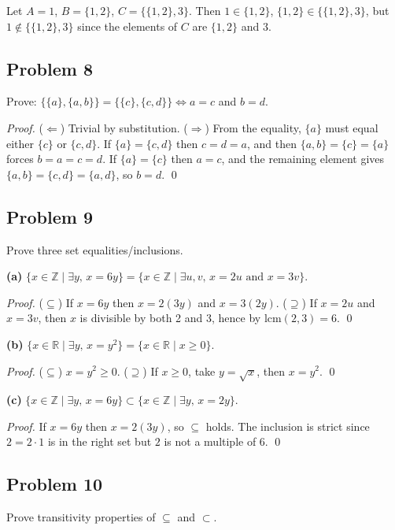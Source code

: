 Let $A = 1$, $B = \{1,2\}$, $C = \{\{1,2\},3\}$.
Then $1 \in \{1,2\}$, $\{1,2\} \in \{\{1,2\},3\}$, but $1 \notin \{\{1,2\},3\}$ since the elements of $C$ are $\{1,2\}$ and $3$.

\subsection*{Problem 8}
Prove: $\{\{a\},\{a,b\}\} = \{\{c\},\{c,d\}\} \iff a=c$ and $b=d$.

\textit{Proof.}
($\Leftarrow$) Trivial by substitution.
($\Rightarrow$) From the equality, $\{a\}$ must equal either $\{c\}$ or $\{c,d\}$.
If $\{a\} = \{c,d\}$ then $c = d = a$, and then $\{a,b\} = \{c\} = \{a\}$ forces $b = a = c = d$.
If $\{a\} = \{c\}$ then $a = c$, and the remaining element gives $\{a,b\} = \{c,d\} = \{a,d\}$, so $b = d$. \qed

\subsection*{Problem 9}
Prove three set equalities/inclusions.

\textbf{(a)} $\{x \in \mathbb{Z} \mid \exists y,\, x = 6y\} = \{x \in \mathbb{Z} \mid \exists u,v,\, x = 2u \text{ and } x = 3v\}$.

\textit{Proof.} ($\subseteq$) If $x = 6y$ then $x = 2(3y)$ and $x = 3(2y)$.
($\supseteq$) If $x = 2u$ and $x = 3v$, then $x$ is divisible by both 2 and 3, hence by $\mathrm{lcm}(2,3) = 6$. \qed

\textbf{(b)} $\{x \in \mathbb{R} \mid \exists y,\, x = y^2\} = \{x \in \mathbb{R} \mid x \ge 0\}$.

\textit{Proof.} ($\subseteq$) $x = y^2 \ge 0$.
($\supseteq$) If $x \ge 0$, take $y = \sqrt{x}$, then $x = y^2$. \qed

\textbf{(c)} $\{x \in \mathbb{Z} \mid \exists y,\, x = 6y\} \subset \{x \in \mathbb{Z} \mid \exists y,\, x = 2y\}$.

\textit{Proof.} If $x = 6y$ then $x = 2(3y)$, so $\subseteq$ holds. The inclusion is strict since $2 = 2 \cdot 1$ is in the right set but $2$ is not a multiple of 6. \qed

\subsection*{Problem 10}
Prove transitivity properties of $\subseteq$ and $\subset$.

